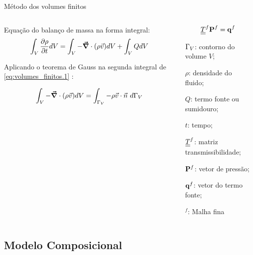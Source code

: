 \documentclass[professionalfont]{beamer}
\begin{document}
\begin{frame}{Método dos volumes finitos}

\begin{columns}
\begin{column}{0.6\textwidth}
Equação do balanço de massa na forma integral:
  \begin{equation}
	\label{eq:volumes_finitos.1}
	\int_{V} \frac{\partial \rho}{\partial t} dV = \int_{V} - \mbox{\boldmath$ \vec{\nabla} $} \cdot (\rho \vec{v}) dV + \int_{V} Q dV
\end{equation}

Aplicando o teorema de Gauss na segunda integral de \eqref{eq:volumes_finitos.1} \cite{Souza2015}:

 \begin{equation}
	 \label{eq:volumes_finitos.2}
	 \int_{V} - \mbox{\boldmath$ \vec{\nabla} $} \cdot (\rho \vec{v}) dV = \int_{\Gamma_{V}} - \rho \vec{v} \cdot \vec{n} \text{ } d \Gamma_{V}
 \end{equation}

\end{column}
\begin{column}{0.4\textwidth}  %
    \begin{equation}
        \underline{\underline{T}}^{f} \mathbf{P}^{f} = \mathbf{q}^{f}
    \end{equation}

    \begin{description}[]
        \small
        \item $\Gamma_{V}$: contorno do volume $V$;
        \item $\rho$: densidade do fluido;
        \item $Q$: termo fonte ou sumidouro;
        \item $t$: tempo;
        \item $\underline{\underline{T}}^{f}$: matriz transmissibilidade;
        \item $\mathbf{P}^{f}$: vetor de pressão;
        \item $\mathbf{q}^{f}$: vetor do termo fonte;
        \item $^{f}$: Malha fina
    \end{description}
    
\end{column}
\end{columns}

\end{frame}



\subsection{Modelo Composicional}
\end{document}
